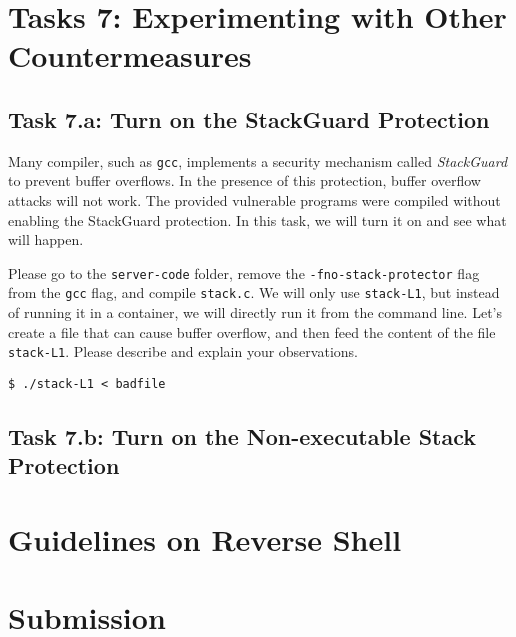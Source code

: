 \section{Tasks 7: Experimenting with Other Countermeasures}

\subsection{Task 7.a: Turn on the StackGuard Protection}

Many compiler, such as \texttt{gcc}, implements a security mechanism called
\textit{StackGuard} to prevent buffer overflows. In the presence of this
protection, buffer overflow attacks will not work.
The provided vulnerable programs were compiled without 
enabling the StackGuard protection.
In this task, we will turn it on and see what will happen.


Please go to the \texttt{server-code} folder, remove the 
\texttt{-fno-stack-protector} flag from the 
\texttt{gcc} flag, and compile \texttt{stack.c}. 
We will only use \texttt{stack-L1}, but 
instead of running it in a container, we will directly 
run it from the command line. Let's create a file
that can cause buffer overflow, and then feed the 
content of the file \texttt{stack-L1}. Please 
describe and explain your observations. 

\begin{lstlisting}
$ ./stack-L1 < badfile 
\end{lstlisting}
 

\subsection{Task 7.b: Turn on the Non-executable Stack Protection}




\section{Guidelines on Reverse Shell} 
\label{sec:guildelines}






\section{Submission}





